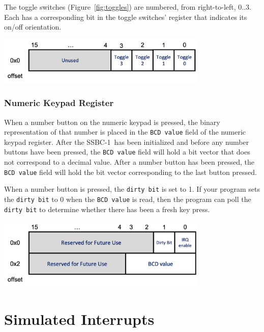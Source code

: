 \documentclass[12pt]{article}
\newcommand{\SSBC}{SSBC-1}
\begin{document}
The toggle switches (Figure~\ref{fig:toggles}) are numbered, from
right-to-left, $0..3$. Each has a corresponding bit in the toggle switches'
register that indicates its on/off orientation.

\begin{center}
\includegraphics[width=10cm]{toggle-register}
\end{center}

\subsubsection{Numeric Keypad Register} \label{sec:keypad}

When a number button on the numeric keypad is pressed, the binary
representation of that number is placed in the \texttt{BCD value} field of the
numeric keypad register. After the \SSBC\ has been initialized and before any
number buttons have been pressed, the \texttt{BCD value} field will hold a bit
vector that does not correspond to a decimal value. After a number button has
been pressed, the \texttt{BCD value} field will hold the bit vector
corresponding to the last button pressed.

When a number button is pressed, the \texttt{dirty bit} is set to 1. If your
program sets the \texttt{dirty bit} to 0 when the \texttt{BCD value} is read,
then the program can poll the \texttt{dirty bit} to determine whether there has
been a fresh key press.

\begin{center}
\includegraphics[width=10cm]{keypad-register}
\end{center}

\section{Simulated Interrupts} \label{sec:interrupts}
\end{document}
